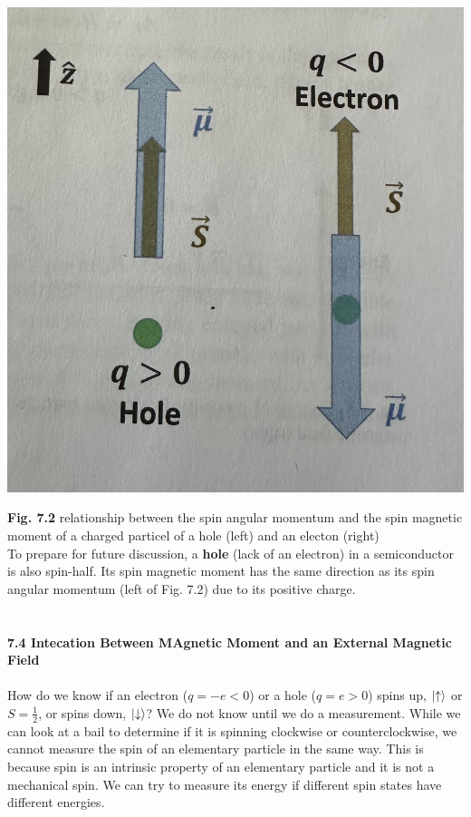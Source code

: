 \documentclass{article}
\begin{document}
\begin{center}
\includegraphics[scale =0.4]{Fig. 7.2.jpeg}\\    
\end{center}
\textbf{Fig. 7.2} relationship between the spin angular momentum and the spin magnetic moment of a charged particel of a hole
(left) and an electon (right)\\

To prepare for future discussion, a \textbf{hole} (lack of an electron) in a semiconductor
is also spin-half. Its spin magnetic moment has the same direction as its spin angular momentum
(left of Fig. 7.2) due to its positive charge.\\\\\\
\textbf{\large 7.4 Intecation Between MAgnetic Moment and an External Magnetic Field}\\\\
How do we know if an electron ($q=-e<0$) or a hole ($q=e>0$) spins up,
$\ket{\uparrow}$ or $S=\frac{1}{2}$, or spins down, $\ket{\downarrow}$? We do not know until
we do a measurement. While we can look at a bail to determine if it is spinning clockwise or
 counterclockwise, we cannot measure the spin of an elementary particle in the same way.
This is because spin is an intrinsic property of an elementary particle and it is not a 
mechanical spin. We can try to measure its energy if different spin states have different energies.
\end{document}
